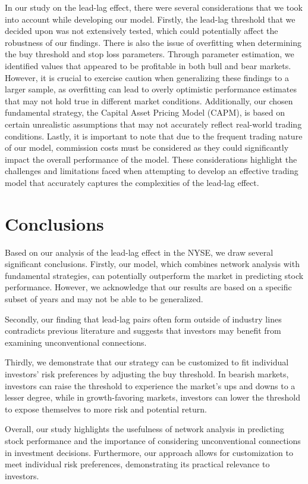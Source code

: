 \documentclass{article}
\begin{document}
In our study on the lead-lag effect, there were several considerations that we took into account
 while developing our model. Firstly, the lead-lag threshold that we decided upon was not extensively tested, 
  which could potentially affect the robustness of our findings. 
  There is also the issue of overfitting when determining the buy threshold and stop loss parameters. Through parameter estimation, we identified values that appeared to be profitable in both bull and bear markets. However, it is crucial to exercise caution when generalizing these findings to a larger sample, as overfitting can lead to overly optimistic performance estimates that may not hold true in different market conditions. 
  Additionally, our chosen fundamental strategy, the Capital Asset Pricing Model (CAPM),
  is based on certain unrealistic assumptions that may not accurately reflect real-world trading conditions. Lastly, it is important to note that due to the frequent trading nature of our model, 
  commission costs must be considered as they could significantly impact the overall performance of the model. These considerations highlight the challenges and limitations
   faced when attempting to develop an effective trading model that accurately captures the complexities of the lead-lag effect.

\section{Conclusions}
Based on our analysis of the lead-lag effect in the NYSE, we draw several significant conclusions. Firstly, our model, which combines network analysis with fundamental strategies, can potentially outperform the market in predicting stock performance. However, we acknowledge that our results are based on a specific subset of years and may not be able to be generalized. 

Secondly, our finding that lead-lag pairs often form outside of industry lines contradicts previous literature and suggests that investors may benefit from examining unconventional connections. 

Thirdly, we demonstrate that our strategy can be customized to fit individual investors' risk preferences by adjusting the buy threshold. In bearish markets, investors can raise the threshold to experience the market's ups and downs to a lesser degree, while in growth-favoring markets, investors can lower the threshold to expose themselves to more risk and potential return. 

Overall, our study highlights the usefulness of network analysis in predicting stock performance and the importance of considering unconventional connections in investment decisions. Furthermore, our approach allows for customization to meet individual risk preferences, demonstrating its practical relevance to investors.
\end{document}
